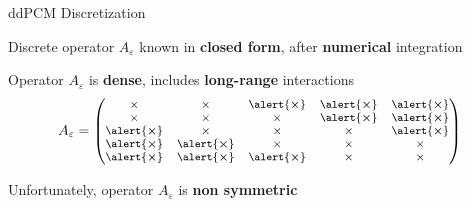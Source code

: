 \begin{frame}{ddPCM Discretization}
\begin{wideitemize}
\item Discrete operator $A_\varepsilon$ known in {\bf closed form}, after {\bf numerical} integration
\item Operator $A_\varepsilon$ is {\bf dense}, includes {\bf long-range} interactions
\[ A_\varepsilon =
{\footnotesize
\begin{pmatrix}
\times				& \times					& \alert{\boldsymbol{\times}}	& \alert{\boldsymbol{\times}} 	& \alert{\boldsymbol{\times}} \\
\times				& \times					& \times					& \alert{\boldsymbol{\times}} 	& \alert{\boldsymbol{\times}} \\
\alert{\boldsymbol{\times}}	& \times					& \times					& \times 					& \alert{\boldsymbol{\times}} \\
\alert{\boldsymbol{\times}}	& \alert{\boldsymbol{\times}}	& \times					& \times 					& \times \\
\alert{\boldsymbol{\times}}	& \alert{\boldsymbol{\times}}	& \alert{\boldsymbol{\times}}	& \times 					& \times 
\end{pmatrix}
}  \displaybump
\]
\item Unfortunately, operator $A_\varepsilon$ is {\bf non symmetric}
\item
\end{wideitemize}


\end{frame}


